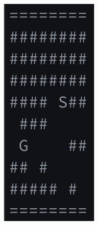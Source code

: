 \documentclass{article}
\begin{document}
\begin{figure}
\centering
\begin{subfigure}{0.2\textwidth}
  \centering
\includegraphics[width=0.8\linewidth]{sg-1.png}
\end{subfigure}%
\begin{subfigure}{0.2\textwidth}
  \centering

\end{subfigure}
\end{figure}
\end{document}
